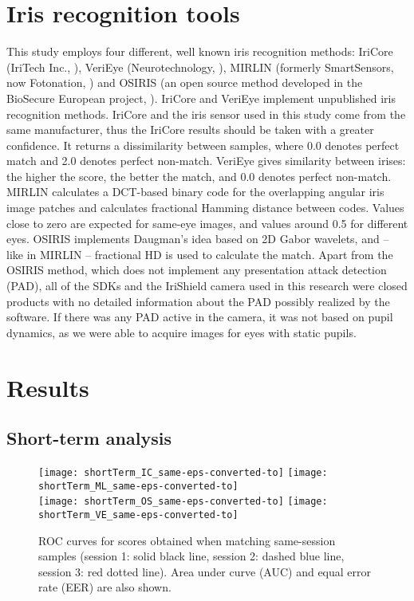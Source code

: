 \documentclass[10pt,twocolumn,letterpaper]{article}
\begin{document}
\section{Iris recognition tools}
This study employs four different, well known iris recognition methods: IriCore (IriTech Inc., \cite{IriCore}), VeriEye (Neurotechnology, \cite{VeriEye}), MIRLIN (formerly SmartSensors, now Fotonation, \cite{MIRLIN}) and OSIRIS (an open source method developed in the BioSecure European project, \cite{OSIRIS}). IriCore and VeriEye implement unpublished iris recognition methods. IriCore and the iris sensor used in this study come from the same manufacturer, thus the IriCore results should be taken with a greater confidence. It returns a dissimilarity between samples, where 0.0 denotes perfect match and 2.0 denotes perfect non-match. VeriEye gives similarity between irises: the higher the score, the better the match, and 0.0 denotes perfect non-match. MIRLIN calculates a DCT-based binary code for the overlapping angular iris image patches and calculates fractional Hamming distance between codes. Values close to zero are expected for same-eye images, and values around 0.5 for different eyes. OSIRIS implements Daugman's idea based on 2D Gabor wavelets, and -- like in MIRLIN -- fractional HD is used to calculate the match. Apart from the OSIRIS method, which does not implement any presentation attack detection (PAD), all of the SDKs and the IriShield camera used in this research were closed products with no detailed information about the PAD possibly realized by the software. If there was any PAD active in the camera, it was not based on pupil dynamics, as we were able to acquire images for eyes with static pupils.

\section{Results}
\label{sec:results}
\subsection{Short-term analysis}

\begin{figure*}[!htb]
	\centering
	\texttt{[image: shortTerm\_IC\_same-eps-converted-to]}\hfill
	\texttt{[image: shortTerm\_ML\_same-eps-converted-to]}\\
	\texttt{[image: shortTerm\_OS\_same-eps-converted-to]}\hfill
	\texttt{[image: shortTerm\_VE\_same-eps-converted-to]}
	\caption{ROC curves for scores obtained when matching same-session samples (session 1: solid black line, session 2: dashed blue line, session 3: red dotted line). Area under curve (AUC) and equal error rate (EER) are also shown.}
	\label{fig:sameSessions}
\end{figure*}
\end{document}
